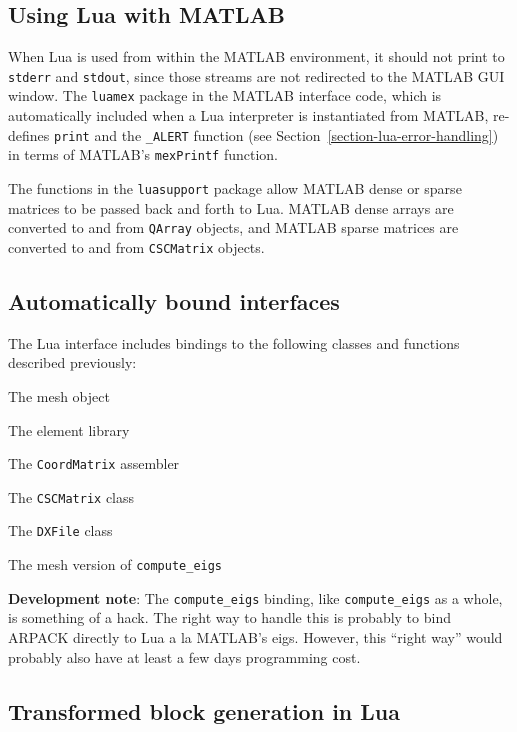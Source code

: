 \documentclass{article}
\newcommand{\devnote}[1]{%
  \begin{trivlist}
  \item\textbf{Development note}: #1
  \end{trivlist}}
\newenvironment{codelist}[1][\quad]%
  {\begin{list}{}{%
   \settowidth{\labelwidth}{\texttt{#1}\hfil}%
   \setlength{\leftmargin}{\labelwidth}%
   \addtolength{\leftmargin}{\labelsep}%
   \addtolength{\leftmargin}{\parindent}%
   \renewcommand{\makelabel}[1]{\texttt{##1}}}}%
  {\end{list}}
\newcommand{\ttt}[1]{\texttt{#1}}
\begin{document}
\subsection{Using Lua with MATLAB}

When Lua is used from within the MATLAB environment, it should not
print to \ttt{stderr} and \ttt{stdout}, since those streams are
not redirected to the MATLAB GUI window.  The \ttt{luamex} package
in the MATLAB interface code, which is automatically included when a
Lua interpreter is instantiated from MATLAB, re-defines \ttt{print}
and the \ttt{\_ALERT} function (see
Section~\ref{section-lua-error-handling}) in terms of MATLAB's
\ttt{mexPrintf} function.

The functions in the \ttt{luasupport} package allow MATLAB dense or
sparse matrices to be passed back and forth to Lua.  MATLAB dense
arrays are converted to and from \ttt{QArray} objects, and MATLAB
sparse matrices are converted to and from \ttt{CSCMatrix} objects.


\subsection{Automatically bound interfaces}

The Lua interface includes bindings to the following classes and
functions described previously:
\begin{codelist}
  \item The mesh object
  \item The element library
  \item The \ttt{CoordMatrix} assembler
  \item The \ttt{CSCMatrix} class
  \item The \ttt{DXFile} class 
  \item The mesh version of \ttt{compute\_eigs}
\end{codelist}

\devnote{The \ttt{compute\_eigs} binding, like
  \ttt{compute\_eigs} as a whole, is something of a hack.  The
  right way to handle this is probably to bind ARPACK directly to Lua
  a la MATLAB's eigs.  However, this ``right way'' would probably also
  have at least a few days programming cost.}


\subsection{Transformed block generation in Lua}
\end{document}
